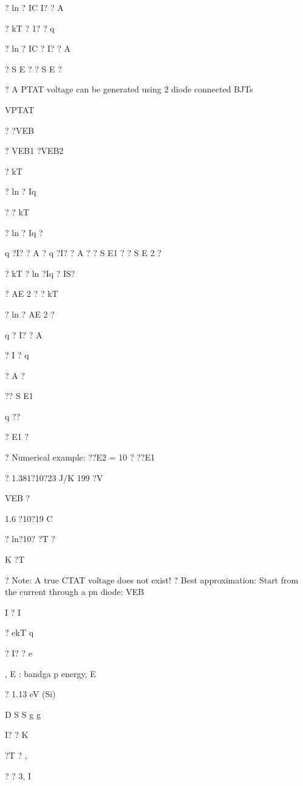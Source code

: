\documentclass[2pt,landscape]{article}
\begin{document}
\begin{multicols*}{5}
? ln ?	IC
I? ? A


?	kT
? 1? ?	q


? ln ?	IC	?
I? ? A


? S	E	?	? S	E ?



?	A PTAT voltage can be generated using 2 
diode connected BJTs



VPTAT


? ?VEB


? VEB1 ?VEB2


? kT


? ln ?	Iq


? ? kT


? ln ?	Iq	?



q	?I? ? A	?	q	?I? ? A	?
? S	E1 ?	? S	E 2 ?


? kT ? ln ?Iq  ? IS?




? AE 2 ? ? kT


? ln ? AE 2 ?



q	? I? ? A


? I ?	q


? A	?


?? S	E1


q ??


?	E1 ?



?	Numerical example:
??E2 = 10 ? ??E1

?	1.381?10?23 J/K	199 ?V



VEB ?


1.6 ?10?19 C


? ln?10? ?T ?


K ?T



?	Note: A true CTAT voltage does not exist!
?	Best approximation: Start from the current through a pn diode:
VEB


I	? I


? ekT q


? I? ? e


, E : 
bandga
p 
energy, 
E


? 1.13 eV 
(Si)


D	S	S	g	g


I? ? K



?T ? ,


? ? 3, I



\end{multicols*}
\end{document}
